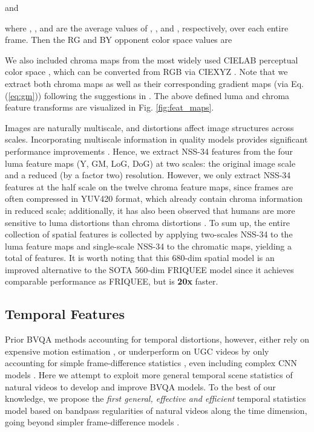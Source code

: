 \documentclass[transmag]{IEEEtran}
\begin{document}
and

where , , and  are the average values of 
, , and , respectively, over each entire frame. Then the RG and BY opponent color space values are


We also included chroma maps  from the most widely used CIELAB perceptual color space \cite{kundu2017no, ghadiyaram2017perceptual}, which can be converted from RGB via CIEXYZ \cite{wiki:CIELAB}. Note that we extract both chroma maps as well as their corresponding gradient maps (via Eq. (\ref{eq:gm})) following the suggestions in \cite{kundu2017no}. The above defined luma and chroma feature transforms are visualized in Fig. \ref{fig:feat_maps}.

Images are naturally multiscale, and distortions
affect image structures across scales. Incorporating multiscale information in quality models provides significant performance improvements \cite{ mittal2012no,wang2003multiscale}. Hence, we extract NSS-34 features from the four luma feature maps (Y, GM, LoG, DoG) at two scales: the original image scale and a reduced (by a factor two) resolution. However, we only extract NSS-34 features at the half scale on the twelve chroma feature maps, since frames are often compressed in YUV420 format, which already contain chroma information in reduced scale; additionally, it has also been observed that humans are more sensitive to luma distortions than chroma distortions \cite{chen2020chroma}. To sum up, the entire collection of spatial features is collected by applying two-scales NSS-34 to the luma feature maps and single-scale NSS-34 to the chromatic maps, yielding a total of  features. It is worth noting that this 680-dim spatial model is an improved alternative to the SOTA 560-dim FRIQUEE model \cite{ghadiyaram2017perceptual} since it achieves comparable performance as FRIQUEE, but is \textbf{20x} faster.

\subsection{Temporal Features}
\label{ssec:temporal_features}

Prior BVQA methods accounting for temporal distortions, however, either rely on expensive motion estimation \cite{saad2014blind, korhonen2019two}, or underperform on UGC videos by only accounting for simple frame-difference statistics \cite{mittal2015completely, sinno2019spatio, yu2020predicting}, even including complex CNN models \cite{li2019quality, kim2018deep}. Here we attempt to exploit more general temporal scene statistics of natural videos to develop and improve BVQA models. To the best of our knowledge, we propose the \textit{first general, effective and efficient} temporal statistics model based on bandpass regularities of natural videos along the time dimension, going beyond simpler frame-difference models \cite{soundararajan2012video}.
\end{document}
